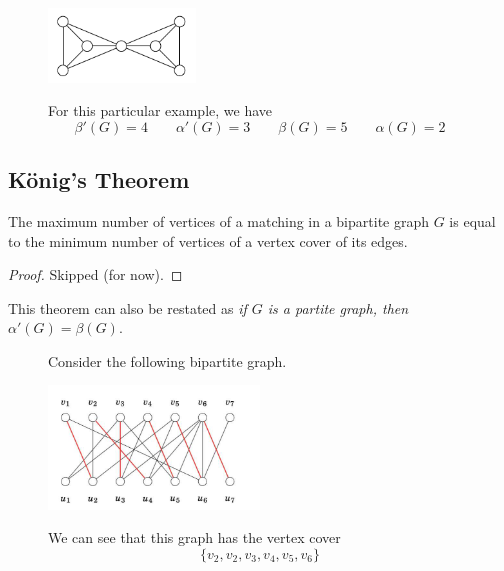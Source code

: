 \begin{figure}
\begin{nexample}
  \begin{center}
    \includegraphics[width=0.35\textwidth]{figures/l08/ve-numbers.png}
  \end{center}
  For this particular example, we have
  \[
    \beta'(G) = 4 \qquad \alpha'(G) = 3 \qquad \beta(G) = 5 \qquad \alpha(G) = 2
  \]
\end{nexample}
\end{figure}

\subsection{K\"onig's Theorem}

\begin{theorem}[K\"onig, 1931]
  The maximum number of vertices of a matching in a bipartite
  graph \(G\) is equal to the minimum number of vertices of a
  vertex cover of its edges.
\end{theorem}

\begin{proof}
  Skipped (for now).
\end{proof}

\begin{remark}
  This theorem can also be restated as \textit{if \(G\) is a partite graph, then
  \(\alpha'(G) = \beta(G)\)}.
\end{remark}

\begin{figure}[ht]
\begin{nexample}
  Consider the following bipartite graph.
  \begin{center}
    \includegraphics[width=0.5\textwidth]{figures/l08/matching-vertex-1}
  \end{center}
  We can see that this graph has the vertex cover
  \[ \{v_2, v_2, v_3, v_4, v_5, v_6\} \]
\end{nexample}
\end{figure}

